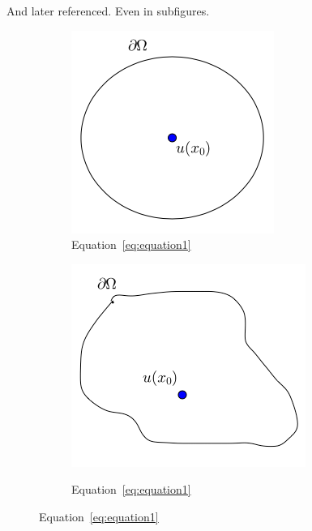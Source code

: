 And later referenced. Even in subfigures.
\begin{figure}[!htb]
  \centering
  \begin{subfigure}[b]{0.3\textwidth}
    \centering
  \includegraphics[width=\textwidth]{images/CircCenter}
  \caption{Equation~\ref{eq:equation1}}\label{fig:circcenter}
\end{subfigure}
\hfill
  \begin{subfigure}[b]{0.3\textwidth}
    \centering
  \includegraphics[width=\textwidth]{images/GeneralOffset}
  \label{fig:generaloffset}
  \caption{Equation~\ref{eq:equation1}}
\end{subfigure}
\end{figure}
